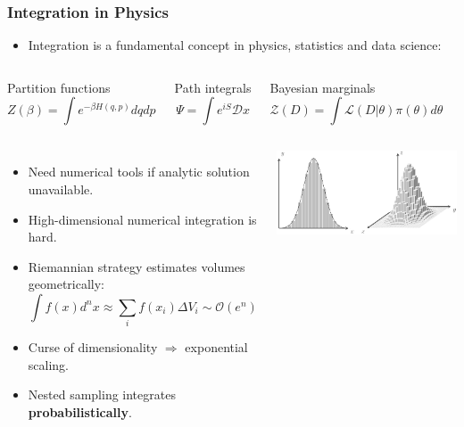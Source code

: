 \documentclass[aspectratio=169]{beamer}
\begin{document}
\begin{frame}
    \frametitle{Integration in Physics}
    \begin{itemize}
        \item Integration is a fundamental concept in physics, statistics and data science:
    \end{itemize}
    \begin{columns}
        \begin{block}{Partition functions}
            \vspace{-11pt}
            \[ Z(\beta) = \int e^{-\beta H(q,p)} dq dp \]
        \end{block}
        \begin{block}{Path integrals}
            \[ \Psi = \int e^{i S} \mathcal{D}x \]
        \end{block}
        \begin{block}{Bayesian marginals}
            \vspace{-11pt}
            \[ \mathcal{Z}(D) = \int \mathcal{L}(D|\theta) \pi(\theta) d\theta \]
        \end{block}
    \end{columns}
    \begin{columns}
        \begin{itemize}
            \item Need numerical tools if analytic solution unavailable.
            \item High-dimensional numerical integration is hard.
            \item Riemannian strategy estimates volumes geometrically:
                \[ \int f(x) d^nx \approx \sum_i f(x_i) \Delta V_i \sim \mathcal{O}(e^n) \]
            \item Curse of dimensionality $\Rightarrow$ exponential scaling.
            \item Nested sampling integrates \textbf{probabilistically}.
        \end{itemize}
        \includegraphics[width=\textwidth]{figures/integration.pdf}
    \end{columns}
\end{frame}
\end{document}
